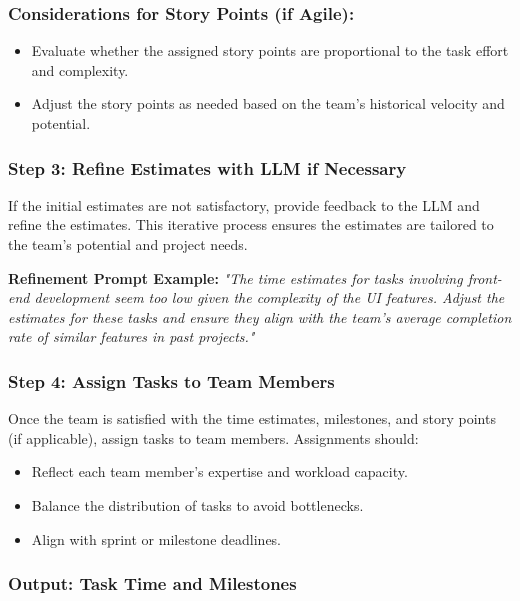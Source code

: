 \documentclass[14pt, a4paper]{article}
\begin{document}
\subsubsection*{Considerations for Story Points (if Agile):}

\begin{itemize}
    \item Evaluate whether the assigned story points are proportional to the
    task effort and complexity.
    \item Adjust the story points as needed based on the team's historical
    velocity and potential.
\end{itemize}

\subsubsection*{Step 3: Refine Estimates with LLM if Necessary}

If the initial estimates are not satisfactory, provide feedback to the LLM and
refine the estimates. This iterative process ensures the estimates are tailored
to the team’s potential and project needs.

\textbf{Refinement Prompt Example:} \textit{"The time estimates for tasks
involving front-end development seem too low given the complexity of the UI
features. Adjust the estimates for these tasks and ensure they align with the
team’s average completion rate of similar features in past projects."}

\subsubsection*{Step 4: Assign Tasks to Team Members}

Once the team is satisfied with the time estimates, milestones, and story points
(if applicable), assign tasks to team members. Assignments should:

\begin{itemize}
    \item Reflect each team member’s expertise and workload capacity.
    \item Balance the distribution of tasks to avoid bottlenecks.
    \item Align with sprint or milestone deadlines.
\end{itemize}

\subsubsection{Output: Task Time and Milestones}
\end{document}
